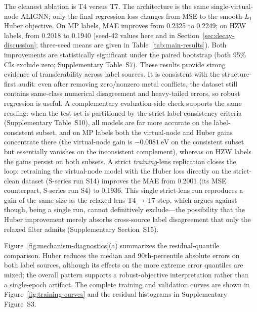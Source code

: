 \documentclass[a4paper,11pt]{article}
\newcommand{\ev}{\mathrm{eV}}
\begin{document}
The cleanest ablation is T4 versus T7. The architecture is the same single-virtual-node ALIGNN; only the final regression loss changes from MSE to the smooth-\(L_1\) Huber objective. On MP labels, MAE improves from 0.2325 to 0.2249; on HZW labels, from 0.2018 to 0.1940 (seed-42 values here and in Section~\ref{sec:decay-discussion}; three-seed means are given in Table~\ref{tab:main-results}). Both improvements are statistically significant under the paired bootstrap (both 95\% CIs exclude zero; Supplementary Table~S7). These results provide strong evidence of transferability across label sources. It is consistent with the structure-first audit: even after removing zero/nonzero metal conflicts, the dataset still contains same-class numerical disagreement and heavy-tailed errors, so robust regression is useful. A complementary evaluation-side check supports the same reading: when the test set is partitioned by the strict label-consistency criteria (Supplementary Table~S10), all models are far more accurate on the label-consistent subset, and on MP labels both the virtual-node and Huber gains concentrate there (the virtual-node gain is \(-0.0081\ \ev\) on the consistent subset but essentially vanishes on the inconsistent complement), whereas on HZW labels the gains persist on both subsets. A strict \emph{training}-lens replication closes the loop: retraining the virtual-node model with the Huber loss directly on the strict-clean dataset (S-series run S14) improves the MAE from 0.2001 (its MSE counterpart, S-series run S4) to 0.1936. This single strict-lens run reproduces a gain of the same size as the relaxed-lens T4\(\rightarrow\)T7 step, which argues against---though, being a single run, cannot definitively exclude---the possibility that the Huber improvement merely absorbs cross-source label disagreement that only the relaxed filter admits (Supplementary Section~S15).

Figure~\ref{fig:mechanism-diagnostics}(a) summarizes the residual-quantile comparison. Huber reduces the median and 90th-percentile absolute errors on both label sources, although its effects on the more extreme error quantiles are mixed; the overall pattern supports a robust-objective interpretation rather than a single-epoch artifact. The complete training and validation curves are shown in Figure~\ref{fig:training-curves} and the residual histograms in Supplementary Figure~S3.
\end{document}
